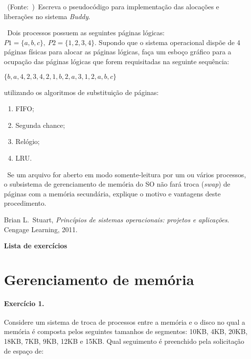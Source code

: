 \exercise~(Fonte:~\cite{stuart2011})~Escreva o pseudocódigo para
implementação das alocações e liberações no sistema {\em Buddy}.

\exercise~Dois processos possuem as seguintes páginas lógicas: $P1 =
\{a, b, c\},\ P2 = \{1, 2, 3, 4\}$. Supondo que o sistema operacional
dispõe de 4 páginas físicas para alocar as páginas lógicas, faça um
esboço gráfico para a ocupação das páginas lógicas que forem
requisitadas na seguinte sequência:

\begin{center}
  $\{b,a,4,2,3,4,2,1,b,2,a,3,1,2,a,b,c\}$
\end{center}
utilizando os algoritmos de substituição de páginas:\\
\begin{enumerate}
\item FIFO;
\item Segunda chance;
\item Relógio;
\item LRU.
\end{enumerate}

\exercise~Se um arquivo for aberto em modo somente-leitura por um ou
vários processos, o subsistema de gerenciamento de memória do SO não
fará troca ({\em swap}) de páginas com a memória secundária, explique
o motivo e vantagens deste procedimento.

\begin{thebibliography}{8}

 Brian L.\ Stuart, \emph{Princípios de sistemas
    operacionais: projetos e aplicações}. Cengage Learning, 2011.

\end{thebibliography}

{\begin{center}\Large \bf Lista de exerc\'icios\end{center}}

\section{Gerenciamento de mem\'oria}

\paragraph{Exerc\'icio 1.} Considere um sistema de troca de processos
entre a mem\'oria e o disco no qual a mem\'oria \'e composta pelos seguintes
tamanhos de segmentos: 10KB, 4KB, 20KB, 18KB, 7KB, 9KB, 12KB e
15KB. Qual seguimento \'e preenchido pela solicita\c{c}\~ao de espa\c{c}o de:

